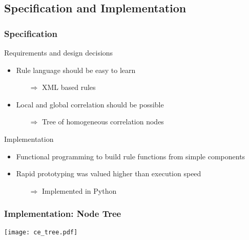 \documentclass[10pt]{beamer}
\begin{document}
\subsection{Specification and Implementation}

\begin{frame}
	\frametitle{Specification}
	\begin{block}{Requirements and design decisions}
		\begin{itemize}
			\item Rule language should be easy to learn
				\begin{itemize}
					\item[$\Rightarrow$] XML based rules
				\end{itemize}
			\item Local and global correlation should be possible
				\begin{itemize}
					\item[$\Rightarrow$] Tree of homogeneous correlation nodes
				\end{itemize}
		\end{itemize}
	\end{block}
	\begin{block}{Implementation}
		\begin{itemize}
			\item Functional programming to build rule functions from simple
				components
			\item Rapid prototyping was valued higher than execution speed
				\begin{itemize}
					\item[$\Rightarrow$] Implemented in Python
				\end{itemize}
		\end{itemize}
	\end{block}
\end{frame}

\begin{frame}
	\frametitle{Implementation: Node Tree}
	\begin{center}\texttt{[image: ce\_tree.pdf]}\end{center}
\end{frame}
\end{document}
